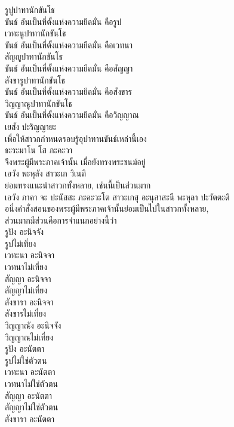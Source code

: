 \documentclass{article}
\begin{document}
รูปูปาทานักขันโธ\\
\indent ขันธ์ อันเป็นที่ตั้งแห่งความยึดมั่น คือรูป\\
เวทะนูปาทานักขันโธ\\
\indent ขันธ์ อันเป็นที่ตั้งแห่งความยึดมั่น คือเวทนา\\
สัญญูปาทานักขันโธ\\
\indent ขันธ์ อันเป็นที่ตั้งแห่งความยึดมั่น คือสัญญา\\
สังขารูปาทานักขันโธ\\
\indent ขันธ์ อันเป็นที่ตั้งแห่งความยึดมั่น คือสังขาร\\
วิญญาณูปาทานักขันโธ\\
\indent ขันธ์ อันเป็นที่ตั้งแห่งความยึดมั่น คือวิญญาณ\\
เยสัง ปะริญญายะ\\
\indent เพื่อให้สาวกกำหนดรอบรู้อุปาทานขันธ์เหล่านี้เอง\\
ธะระมาโน โส ภะคะวา\\
\indent จึงพระผู้มีพระภาคเจ้านั้น เมื่อยังทรงพระชนม์อยู่\\
เอวัง พะหุลัง สาวะเก วิเนติ\\
\indent ย่อมทรงแนะนำสาวกทั้งหลาย, เช่นนี้เป็นส่วนมาก\\
เอวัง ภาคา จะ ปะนัสสะ ภะคะวะโต สาวะเกสุ อะนุสาสะนี พะหุลา ปะวัตตะติ\\
\indent อนึ่งคำสั่งสอนของพระผู้มีพระภาคเจ้านั้นย่อมเป็นไปในสาวกทั้งหลาย,\\
ส่วนมากมีส่วนคือการจำแนกอย่างนี้ว่า\\
รูปัง อะนิจจัง\\
\indent รูปไม่เที่ยง\\
เวทะนา อะนิจจา\\
\indent เวทนาไม่เที่ยง\\
สัญญา อะนิจจา\\
\indent สัญญาไม่เที่ยง\\
สังขารา อะนิจจา\\
\indent สังขารไม่เที่ยง\\
วิญญาณัง อะนิจจัง\\
\indent วิญญาณไม่เที่ยง\\
รูปัง อะนัตตา\\
\indent รูปไม่ใช่ตัวตน\\
เวทะนา อะนัตตา\\
\indent เวทนาไม่ใช่ตัวตน\\
สัญญา อะนัตตา\\
\indent สัญญาไม่ใช่ตัวตน\\
สังขารา อะนัตตา\\
\end{document}
